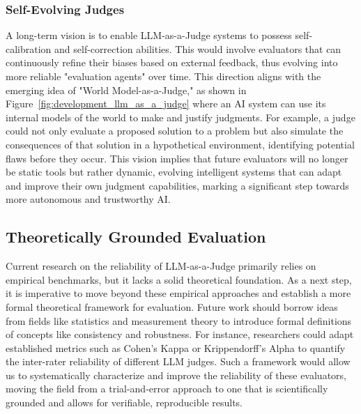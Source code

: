\documentclass[acmsmall,screen]{acmart}
\begin{document}
\subsubsection{\textbf{Self-Evolving Judges}}\label{subsec:future_self_evolving}

A long-term vision is to enable LLM-as-a-Judge systems to possess self-calibration and self-correction abilities. This would involve evaluators that can continuously refine their biases based on external feedback, thus evolving into more reliable "evaluation agents" over time. This direction aligns with the emerging idea of "World Model-as-a-Judge," as shown in Figure~\ref{fig:development_llm_as_a_judge} where an AI system can use its internal models of the world to make and justify judgments. For example, a judge could not only evaluate a proposed solution to a problem but also simulate the consequences of that solution in a hypothetical environment, identifying potential flaws before they occur. This vision implies that future evaluators will no longer be static tools but rather dynamic, evolving intelligent systems that can adapt and improve their own judgment capabilities, marking a significant step towards more autonomous and trustworthy AI.

\subsection{Theoretically Grounded Evaluation}\label{subsec:future_theoretically}

Current research on the reliability of LLM-as-a-Judge primarily relies on empirical benchmarks, but it lacks a solid theoretical foundation. As a next step, it is imperative to move beyond these empirical approaches and establish a more formal theoretical framework for evaluation. Future work should borrow ideas from fields like statistics and measurement theory to introduce formal definitions of concepts like consistency and robustness. For instance, researchers could adapt established metrics such as Cohen's Kappa or Krippendorff's Alpha to quantify the inter-rater reliability of different LLM judges. Such a framework would allow us to systematically characterize and improve the reliability of these evaluators, moving the field from a trial-and-error approach to one that is scientifically grounded and allows for verifiable, reproducible results.
\end{document}

